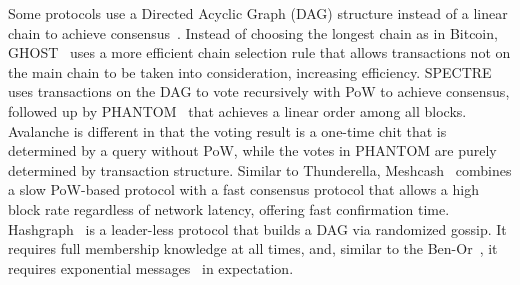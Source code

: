 {Some protocols use a Directed Acyclic Graph (DAG) structure instead of a linear chain to achieve
consensus~\cite{SompolinskyZ15,SompolinskyLZ16,SompolinskyZ18,BentovHMN17,baird2016hashgraph}.
Instead of choosing the longest chain as in Bitcoin,
GHOST~\cite{SompolinskyZ15} uses a more efficient chain selection rule that
allows transactions not on the main chain to be taken into consideration, increasing efficiency.
SPECTRE~\cite{SompolinskyLZ16} uses transactions on
the DAG to vote recursively with PoW to achieve consensus, followed up by
PHANTOM~\cite{SompolinskyZ18} that achieves a linear order among all blocks.
Avalanche
is different in that the voting result is a one-time chit that is determined by
a query without PoW, while the votes in PHANTOM are purely determined by transaction structure.
Similar to Thunderella, Meshcash~\cite{BentovHMN17} combines a slow PoW-based protocol with a fast consensus protocol that allows a high block rate regardless of network latency, offering fast confirmation time.
Hashgraph~\cite{baird2016hashgraph} is a leader-less protocol that builds a DAG via randomized gossip. 
It requires full membership knowledge at all times, and, similar to the Ben-Or~\cite{ben1983another}, it requires exponential messages~\cite{aspnes2003randomized,CachinV17} in expectation.
}

\begin{comment}
Moreover, in Theorem 5.16, the author mentions if
there is no supermajority virtual vote, all honest nodes will randomly choose
their votes for the next round. Then with non-zero probability, they could
choose the same vote.  The rounds are repeated until all honest nodes
eventually reach the same vote by chance.  This means as the total number of
nodes increases in Hashgraph, the probability of reaching the same vote in a
single trial drops exponentially due to the random voting~\cite{CachinV17}.
\end{comment}

%

